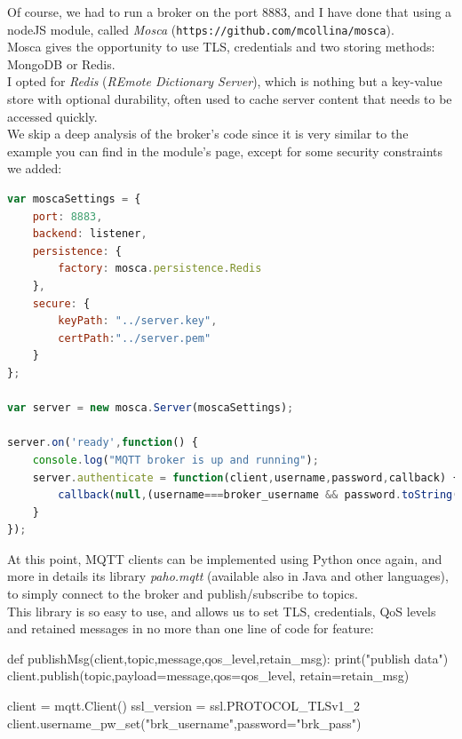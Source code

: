\documentclass[12pt]{report}
\begin{document}
{Of course, we had to run a broker on the port 8883, and I have done that using a nodeJS module, called \emph{Mosca} (\texttt{https://github.com/mcollina/mosca}).\\ Mosca gives the opportunity to use TLS, credentials and two storing methods: MongoDB or Redis.\\
I opted for \emph{Redis} (\emph{REmote Dictionary Server}), which is  nothing but a key-value store with optional durability, often used to cache server content that needs to be accessed quickly.\\
We skip a deep analysis of the broker's code since it is very similar to the example you can find in the module's page, except for some security constraints we added:

\begin{center}
  \lstset{%
    caption=Mosca broker security settings,
    basicstyle=\ttfamily\small\bfseries,
    frame=tb
  }
\begin{lstlisting}[language=javascript,caption=Mosca broker security settings]
var moscaSettings = {
	port: 8883,
	backend: listener,
	persistence: {
		factory: mosca.persistence.Redis
	},
	secure: {
		keyPath: "../server.key",
		certPath:"../server.pem"
	}
};

var server = new mosca.Server(moscaSettings);

server.on('ready',function() {
	console.log("MQTT broker is up and running");
	server.authenticate = function(client,username,password,callback) {
		callback(null,(username===broker_username && password.toString('ascii')===broker_password))
	}
});
\end{lstlisting}
\end{center}


At this point, MQTT clients can be implemented using Python once again, and more in details its library \emph{paho.mqtt} (available also in Java and other languages), to simply connect to the broker and publish/subscribe to topics.\\
This library is so easy to use, and allows us to set TLS, credentials, QoS levels and retained messages in no more than one line of code for feature:\\

\begin{python}
def publishMsg(client,topic,message,qos_level,retain_msg):
	print("publish data")
	client.publish(topic,payload=message,qos=qos_level,    					retain=retain_msg)

client = mqtt.Client()
ssl_version = ssl.PROTOCOL_TLSv1_2
client.username_pw_set("brk_username",password="brk_pass")


\end{python}}
\end{document}
